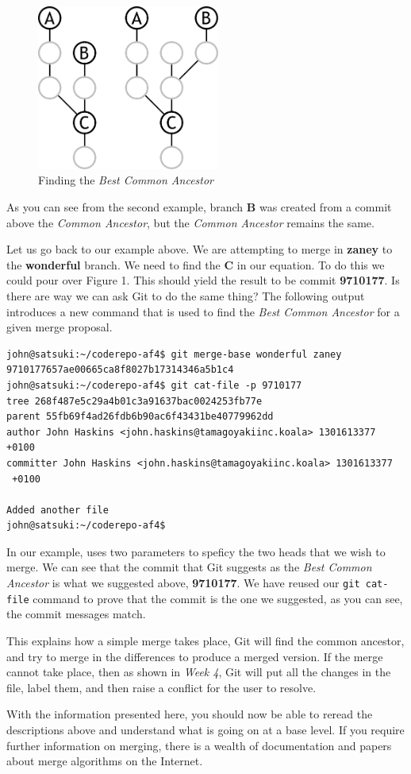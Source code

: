\begin{figure}[hbt]
\centering
\includegraphics[width=6cm]{images/f-af4-d2.pdf}
\caption{Finding the \emph{Best Common Ancestor}}
\end{figure}

As you can see from the second example, branch \textbf{B} was created from a commit above the \emph{Common Ancestor}, but the \emph{Common Ancestor} remains the same.  

Let us go back to our example above.  We are attempting to merge in \textbf{zaney} to the \textbf{wonderful} branch.  We need to find the \textbf{C} in our equation.  To do this we could pour over Figure 1.  This should yield the result to be commit \textbf{9710177}.  Is there are way we can ask Git to do the same thing?  The following output introduces a new command that is used to find the \emph{Best Common Ancestor} for a given merge proposal.

\begin{Verbatim}
john@satsuki:~/coderepo-af4$ git merge-base wonderful zaney
9710177657ae00665ca8f8027b17314346a5b1c4
john@satsuki:~/coderepo-af4$ git cat-file -p 9710177
tree 268f487e5c29a4b01c3a91637bac0024253fb77e
parent 55fb69f4ad26fdb6b90ac6f43431be40779962dd
author John Haskins <john.haskins@tamagoyakiinc.koala> 1301613377 +0100
committer John Haskins <john.haskins@tamagoyakiinc.koala> 1301613377 
 +0100

Added another file
john@satsuki:~/coderepo-af4$ 
\end{Verbatim}

In our example,  uses two parameters to speficy the two heads that we wish to merge.  We can see that the commit that Git suggests as the \emph{Best Common Ancestor} is what we suggested above, \textbf{9710177}.  We have reused our \texttt{git cat-file} command to prove that the commit is the one we suggested, as you can see, the commit messages match.

This explains how a simple merge takes place, Git will find the common ancestor, and try to merge in the differences to produce a merged version.  If the merge cannot take place, then as shown in \emph{Week 4}, Git will put all the changes in the file, label them, and then raise a conflict for the user to resolve.  

With the information presented here, you should now be able to reread the descriptions above and understand what is going on at a base level.  If you require further information on merging, there is a wealth of documentation and papers about merge algorithms on the Internet.

